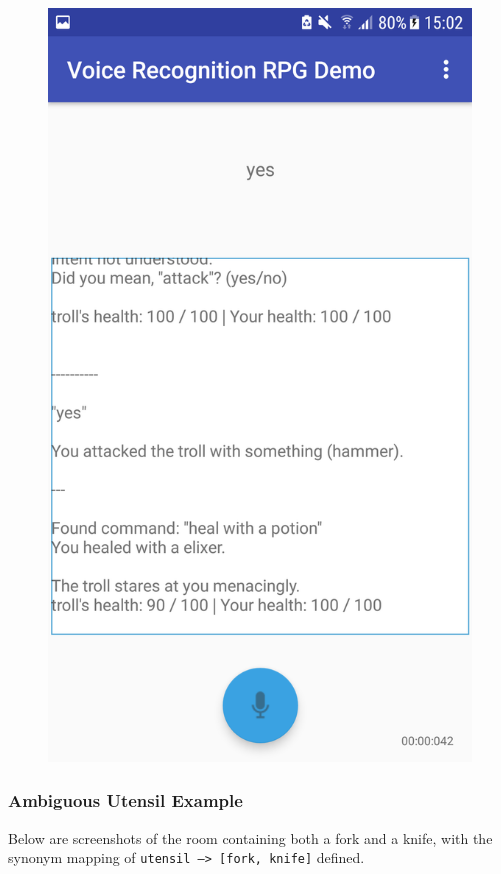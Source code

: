 \documentclass[11pt]{article}
\begin{document}
\begin{center}
\begin{figure}[H]
\begin{center}
  \includegraphics[scale=0.25]{Screenshot_20180527-150225.png}
  \label{fig:snapshot-multiple-command-2}
  \end{center}
\end{figure}
\end{center}

\newpage
\subsubsection{Ambiguous Utensil Example}
\label{appendix:utensil}
Below are screenshots of the room containing both a fork and a knife, with the synonym mapping of \texttt{utensil --> [fork, knife]} defined.
\end{document}
